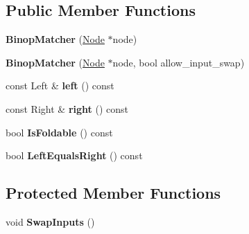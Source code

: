\subsection*{Public Member Functions}
\begin{DoxyCompactItemize}
\item 
{\bfseries Binop\+Matcher} (\hyperlink{classv8_1_1internal_1_1compiler_1_1_node}{Node} $\ast$node)\hypertarget{structv8_1_1internal_1_1compiler_1_1_binop_matcher_aa9beccff23bb91beb638b797d13b2807}{}\label{structv8_1_1internal_1_1compiler_1_1_binop_matcher_aa9beccff23bb91beb638b797d13b2807}

\item 
{\bfseries Binop\+Matcher} (\hyperlink{classv8_1_1internal_1_1compiler_1_1_node}{Node} $\ast$node, bool allow\+\_\+input\+\_\+swap)\hypertarget{structv8_1_1internal_1_1compiler_1_1_binop_matcher_ac8203bbe5394ee8a31d38c7bfb2a13eb}{}\label{structv8_1_1internal_1_1compiler_1_1_binop_matcher_ac8203bbe5394ee8a31d38c7bfb2a13eb}

\item 
const Left \& {\bfseries left} () const \hypertarget{structv8_1_1internal_1_1compiler_1_1_binop_matcher_a21915943bf36b14ee5b0e7a9d2bf551b}{}\label{structv8_1_1internal_1_1compiler_1_1_binop_matcher_a21915943bf36b14ee5b0e7a9d2bf551b}

\item 
const Right \& {\bfseries right} () const \hypertarget{structv8_1_1internal_1_1compiler_1_1_binop_matcher_af06d0642675cc89e0de16a996890719a}{}\label{structv8_1_1internal_1_1compiler_1_1_binop_matcher_af06d0642675cc89e0de16a996890719a}

\item 
bool {\bfseries Is\+Foldable} () const \hypertarget{structv8_1_1internal_1_1compiler_1_1_binop_matcher_a8aa293ba6180cc233cef3512ea4a9880}{}\label{structv8_1_1internal_1_1compiler_1_1_binop_matcher_a8aa293ba6180cc233cef3512ea4a9880}

\item 
bool {\bfseries Left\+Equals\+Right} () const \hypertarget{structv8_1_1internal_1_1compiler_1_1_binop_matcher_a511d0831bacef4b42b8e41fffb949568}{}\label{structv8_1_1internal_1_1compiler_1_1_binop_matcher_a511d0831bacef4b42b8e41fffb949568}

\end{DoxyCompactItemize}
\subsection*{Protected Member Functions}
\begin{DoxyCompactItemize}
\item 
void {\bfseries Swap\+Inputs} ()\hypertarget{structv8_1_1internal_1_1compiler_1_1_binop_matcher_a64e5dc2c24820c9a364f711d76764c6d}{}\label{structv8_1_1internal_1_1compiler_1_1_binop_matcher_a64e5dc2c24820c9a364f711d76764c6d}

\end{DoxyCompactItemize}
